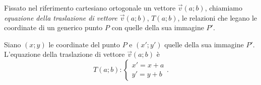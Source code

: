 \begin{definizione}
  Fissato nel riferimento cartesiano ortogonale un vettore 
  \(\vec{v}(a;b)\), chiamiamo \emph{equazione della traslazione di 
     vettore \(\vec{v}(a;b)\)}, \(T(a;b)\), le relazioni che legano le 
  coordinate di un generico punto \(P\) con quelle della sua immagine 
  \(P'\).
\end{definizione}

Siano \((x;y)\) le coordinate del punto \(P\) e \((x';y')\) quelle della 
sua immagine \(P'\). L'equazione della traslazione di vettore 
\(\vec{v}(a;b)\) è
\[T(a;b):\begin{cases}x'=x+a\\y'=y+b\end{cases}.\]

% 
% 
% 
% 
